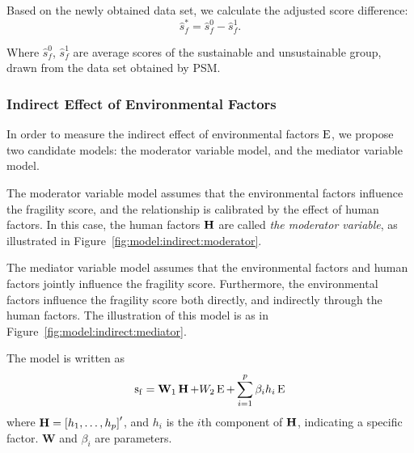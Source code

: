Based on the newly obtained data set, we calculate the adjusted score difference:
\begin{equation}
   \hat{s}^*_f=\hat{s}^0_f - \hat{s}^1_f.
   \label{eqn:model:score_diff_adj}
\end{equation}

Where $\hat{s}^0_f$, $\hat{s}^1_f$ are average scores of the sustainable and unsustainable group, drawn from the data set obtained by PSM.

\subsubsection{Indirect Effect of Environmental Factors}
\label{sec:model:indirect}
In order to measure the indirect effect of environmental factors $\operatorname*{E}$, we propose two candidate models: the moderator variable model, and the mediator variable model.

The moderator variable model assumes that the environmental factors influence the fragility score, and the relationship is calibrated by the effect of human factors. 
In this case, the human factors $\operatorname*{\mathbf{H}}$ are called \emph{the moderator variable}, as illustrated in Figure~\ref{fig:model:indirect:moderator}.

The mediator variable model assumes that the environmental factors and human factors jointly influence the fragility score.
Furthermore, the environmental factors influence the fragility score both directly, and indirectly through the human factors. The illustration of this model is as in Figure~\ref{fig:model:indirect:mediator}.

The model is written as 
\begin{equation}
    \operatorname*{s_f} = \mathbf{W}_1\operatorname*{\mathbf{H}} + W_2\operatorname*{E} + \sum_{i=1}^p \beta_i h_i \operatorname*{E} 
    \label{eqn:model:moderator_model}
\end{equation}
where $\operatorname*{\mathbf{H}}=\left[ h_1,\ldots,h_p \right]'$, and $h_i$ is the $i$th component of $\operatorname*{\mathbf{H}}$, indicating a specific factor. $\mathbf{W}$ and $\beta_i$ are parameters.

